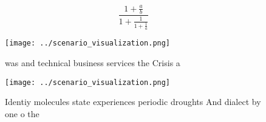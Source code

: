 \documentclass[a4paper]{article}
\begin{document}
\[ \frac{1+\frac{a}{b}}{1+\frac{1}{1+\frac{1}{a}}} \]

\begin{figure}
\centering
\texttt{[image: ../scenario\_visualization.png]}
\caption{ was and technical business services the Crisis a
}
\end{figure}
 
\begin{figure}
\centering
\texttt{[image: ../scenario\_visualization.png]}
\caption{Identiy molecules state experiences periodic droughts And dialect by one o the 
}
\end{figure}
 
\end{document}
